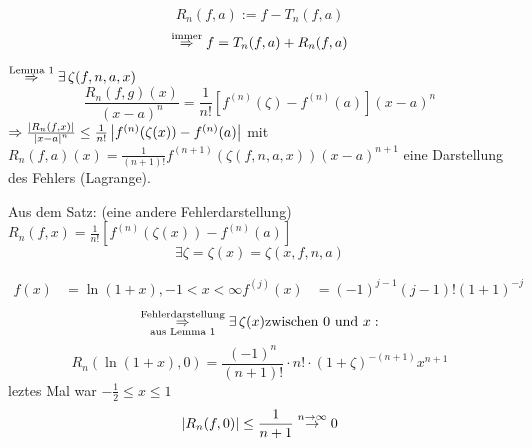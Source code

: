 \documentclass[../ana2.tex]{subfiles}
\begin{document}
\[ R_n(f,a) := f - T_n(f, a) \]
\[ \overset{\text{immer}}{\Rightarrow} f = T_n(f,a) + R_n(f,a) \]



\( \oversett{Lemma 1}{\Rightarrow} \exists \zeta(f,n,a,x) \)
\[ \frac{ R_n(f,g)(x) }{(x-a)^n} = \frac{1}{n!} 
[f^{(n)}(\zeta) - f^{(n)}(a)] (x-a)^n \]
\( \Rightarrow \frac{ \left|R_n(f, x)\right| }{ \left|x-a\right|^n } 
\leq \frac{1}{n!} \left| f^{(n)}(\zeta(x)) - f^{(n)}(a) \right| \)
mit \( R_n(f,a)(x) = \frac{1}{(n+1)!} 
f^{(n+1)}(\zeta(f,n,a,x)) (x-a)^{n+1} \) eine Darstellung 
des Fehlers (Lagrange).

Aus dem Satz: (eine andere Fehlerdarstellung)
\( R_n(f,x) = \frac{1}{n!} [f^{(n)}(\zeta(x)) - f^{(n)}(a)] \)
\[ \exists \zeta = \zeta(x) = \zeta(x,f,n,a) \]

\begin{bsp}
    \begin{align*}
        f(x) &= \ln(1+x), -1 < x < \infty
        f^{(j)}(x) &= (-1)^{j-1}(j-1)!(1+1)^{-j}        
    \end{align*}    
    \[ \overundersett{Fehlerdarstellung}{aus Lemma 1}{\Rightarrow} 
    \exists \zeta(x) \text{zwischen } 0 \text{ und } x: \]
    \[ R_n(\ln(1+x),0) = \frac{(-1)^n}{(n+1)!} \cdot n! 
    \cdot (1+\zeta)^{-(n+1)}x^{n+1} \]
    leztes Mal war \( -\frac{1}{2} \leq x \leq 1 \)
    \[ \left|R_n(f, 0)\right| \leq \frac{1}{n+1} \overset{n \rightarrow \infty}{\rightarrow} 0\]
\end{bsp}
\end{document}

